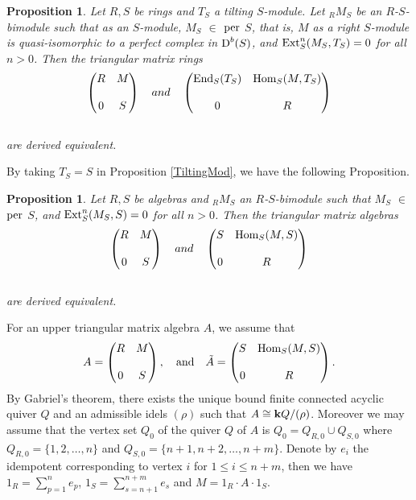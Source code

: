 \documentclass[a4paper, reqno]{amsart}
\newtheorem{prop}[thm]{Proposition}
\theoremstyle{definition}
\theoremstyle{remark}
\numberwithin{equation}{section}
\def\Hom{{\rm Hom}}
\def\Ext{{\rm Ext}}
\begin{document}
\begin{prop} \cite[Theorem 4.5]{Lad2011}
 Let $R, S$  be rings and  $T_S$  a tilting $S$-module. Let ${_R}M_S$ be an $R$-$S$-bimodule such that as an $S$-module, $M_S$ $\in$ $\rm{per}$ $S$,  that is, $M$ as a right $S$-module is quasi-isomorphic to a perfect complex in $\textup{D}^{b}(S)$, and $\Ext^n_S(M_S,T_S)=0$ for all $n > 0$.
Then the triangular matrix rings
$$
     \left( \begin{matrix}
     R  & M      \cr\cr
     0  & S      
\end{matrix}\right)\,\,\,\,\,\,
 and\,\,\,\,\,\,
 \left( \begin{matrix}
     {\rm{End}}_{S}(T_S)  & \Hom{_S(M,T_S)}      \cr\cr
     0  & R      
\end{matrix}\right)
 $$\\
 are derived equivalent. 

\end{prop}

By taking $T_S = S$ in Proposition \ref{TiltingMod}, we have the following Proposition.

\begin{prop} \cite[Corollary 4.11]{Lad2011}
Let $R, S$ be algebras and ${_R}M_S$ an $R$-$S$-bimodule such that $M_S$ $\in$ $\rm{per}$ $S$, and $\Ext^n_S(M_S,S)=0$ for all $n > 0$. Then the triangular matrix algebras
$$
     \left( \begin{matrix}
     R  & M      \cr\cr
     0  & S      
\end{matrix}\right)\,\,\,\,\,\,
 and\,\,\,\,\,\,
 \left( \begin{matrix}
     S  & \Hom{_S(M,S)}      \cr\cr
     0  & R      
\end{matrix}\right)
 $$\\
 are derived equivalent. 

\end{prop}

For an upper triangular matrix algebra $A$, we assume that $$
   A=\left( \begin{matrix}
     R  & M      \cr\cr
     0  & S      
\end{matrix}\right),\,\,\,\,\,\,
 \textup{and}\,\,\,\,\,\,
 \tilde{A}=\left( \begin{matrix}
     S  & \Hom{_S(M,S)}      \cr\cr
     0  & R      
\end{matrix}\right).
 $$
By Gabriel's theorem, there exists the unique bound finite connected acyclic quiver $Q$ and an admissible idels $(\rho)$ such that $A\cong {\bf k}Q/(\rho)$. Moreover we may assume that the vertex set $Q_0$ of the quiver $Q$ of $A$ is $Q_0=Q_{R,0}\cup Q_{S,0}$ where $Q_{R,0}= \{1,2,\dots,n\}$ and $Q_{S,0}= \{ n+1,n+2,\dots,n+m\}$. Denote by $e_i$ the idempotent corresponding to vertex $i$ for $1\leq i\leq n+m$, then we have $1_R= \sum_{p=1}^{n} e_p$, $1_S= \sum_{s=n+1}^{n+m} e_s$ and $M=1_R\cdot A\cdot 1_S$. 
\end{document}
